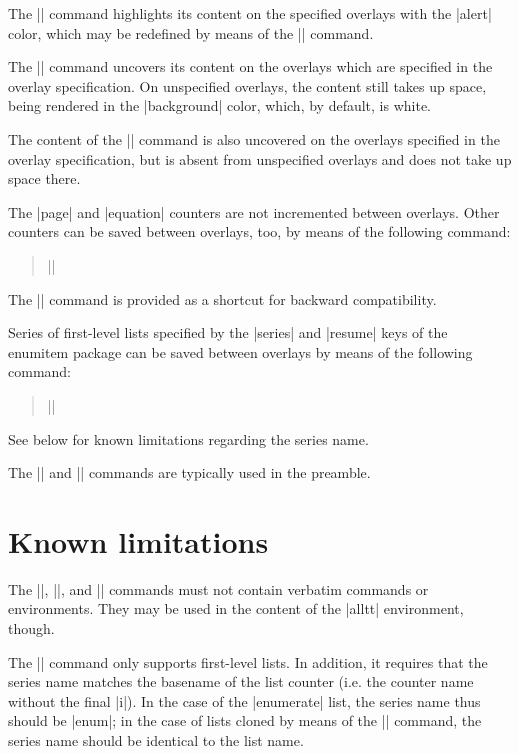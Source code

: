 \documentclass[a4paper]{ltxdoc}
\begin{document}
The |\alert| command highlights its content on the specified overlays with the
|alert| color, which may be redefined by means of the |\definecolor| command.

The |\visible| command uncovers its content on the overlays which are specified
in the overlay specification. On unspecified overlays, the content still takes
up space, being rendered in the |background| color, which, by default, is white.

The content of the |\only| command is also uncovered on the overlays specified
in the overlay specification, but is absent from unspecified overlays and does
not take up space there.

\pagebreak
\DescribeMacro{\savecountersbetweenoverlays}
The |page| and |equation| counters are not incremented between overlays. Other
counters can be saved between overlays, too, by means of the following command:
\begin{quote}
||
\end{quote}
\DescribeMacro{\savebetweenoverlays}
The |\savebetweenoverlays| command is provided as a shortcut for backward
compatibility.

\DescribeMacro{\saveseriesbetweenoverlays}
Series of first-level lists specified by the |series| and |resume| keys of the
\textsf{enumitem} package can be saved between overlays by means of the
following command:
\begin{quote}
||
\end{quote}
See below for known limitations regarding the series name.

The |\savecountersbetweenoverlays| and |\saveseriesbetweenoverlays| commands
are typically used in the preamble.

\section{Known limitations}

The |\alert|, |\visible|, and |\only| commands must not contain verbatim
commands or environments. They may be used in the content of the |alltt|
environment, though.

The |\saveseriesbetweenoverlays| command only supports first-level lists. In
addition, it requires that the series name matches the basename of the list
counter (i.e. the counter name without the final |i|). In the case of the
|enumerate| list, the series name thus should be |enum|; in the case of lists
cloned by means of the |\newlist| command, the series name should be identical
to the list name.
\end{document}
